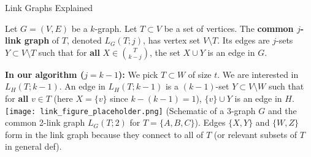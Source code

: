 \documentclass{beamer}
\newcommand{\link}[3]{\ensuremath{L_{#1}\left(#2; #3\right)}} %
\begin{document}
\begin{frame}{Link Graphs Explained}
  \begin{definition}
  Let $G=(V,E)$ be a $k$-graph. Let $T \subset V$ be a set of vertices.
  The \textbf{common $j$-link graph} of $T$, denoted $\link{G}{T}{j}$, has vertex set $V \setminus T$.
  Its edges are $j$-sets $Y \subset V \setminus T$ such that for \textbf{all} $X \in \binom{T}{k-j}$, the set $X \cup Y$ is an edge in $G$.
  \end{definition}
  \pause
  \textbf{In our algorithm ($j=k-1$):}
  We pick $T \subset W$ of size $t$. We are interested in $\link{H}{T}{k-1}$.
  An edge in $\link{H}{T}{k-1}$ is a $(k-1)$-set $Y \subset V \setminus W$ such that for \textbf{all} $v \in T$ (here $X=\{v\}$ since $k-(k-1)=1$), $\{v\} \cup Y$ is an edge in $H$.
  \bigskip
  \pause
  \centering
  \texttt{[image: link\_figure\_placeholder.png]} %
  \tiny (Schematic of a 3-graph $G$ and the common 2-link graph $\link{G}{T}{2}$ for $T=\{A,B,C\}$).
  Edges $\{X,Y\}$ and $\{W,Z\}$ form in the link graph because they connect to all of $T$ (or relevant subsets of $T$ in general def).
\end{frame}
\end{document}
